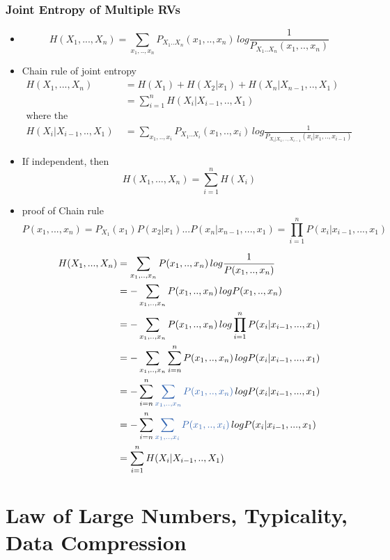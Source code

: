 \documentclass[24pt]{article}
\begin{document}
\subsubsection{Joint Entropy of Multiple RVs}
\begin{itemize}
\item 
$$ H(X_1,...,X_n) = \sum_{x_1,..,x_n}P_{X_1..X_n}(x_1,..,x_n)\,log\frac{1}{P_{X_1..X_n}(x_1,..,x_n)}$$
\item Chain rule of joint entropy
\begin{align*}
H(X_1,...,X_n) &= H(X_1) + H(X_2|x_1) + H(X_n|X_{n-1},..,X_1) \\
&=\sum_{i=1}^nH(X_i|X_{i-1},..,X_1) \\
\textrm{where the conditional entropy } \\
H(X_i|X_{i-1},..,X_1)&=\sum_{x_1,..,x_i}P_{X_1..X_i}(x_1,..,x_i)\,log\frac{1}{P_{X_i|X_1,..,X_{i-1}}(x_i|x_1,..,x_{i-1})}
\end{align*}
\item If independent, then
$$H(X_1,...,X_n) = \sum_{i=1}^nH(X_i) $$ 

\item proof of Chain rule
$$ P(x_1,...,x_n) =  P_{X_1}(x_1)P(x_2|x_1)...P(x_n|x_{n-1},...,x_1) = \prod_{i=1}^nP(x_i|x_{i-1},...,x_1) $$

\begin{align*}
H(X_1,...,X_n) &= \sum_{x_1,..,x_n}P(x_1,..,x_n)\,log\frac{1}{P(x_1,..,x_n)}\\
&= - \sum_{x_1,..,x_n}P(x_1,..,x_n)\,logP(x_1,..,x_n)\\
&= - \sum_{x_1,..,x_n}P(x_1,..,x_n)\,log\prod_{i=1}^nP(x_i|x_{i-1},...,x_1)\\
&= - \sum_{x_1,..,x_n}\sum_{i=n}^nP(x_1,..,x_n)\,logP(x_i|x_{i-1},...,x_1)\\
&= - \sum_{i=n}^n\textcolor{blue1}{\sum_{x_1,..,x_n}P(x_1,..,x_n)}\,logP(x_i|x_{i-1},...,x_1) \\
&= - \sum_{i=n}^n\textcolor{blue1}{\sum_{x_1,..,x_i}P(x_1,..,x_i)}\,logP(x_i|x_{i-1},...,x_1) \\
&= \sum_{i=1}^nH(X_i|X_{i-1},..,X_1)
\end{align*}
\end{itemize}
\newpage
\section{Law of Large Numbers, Typicality, Data Compression}
\end{document}
